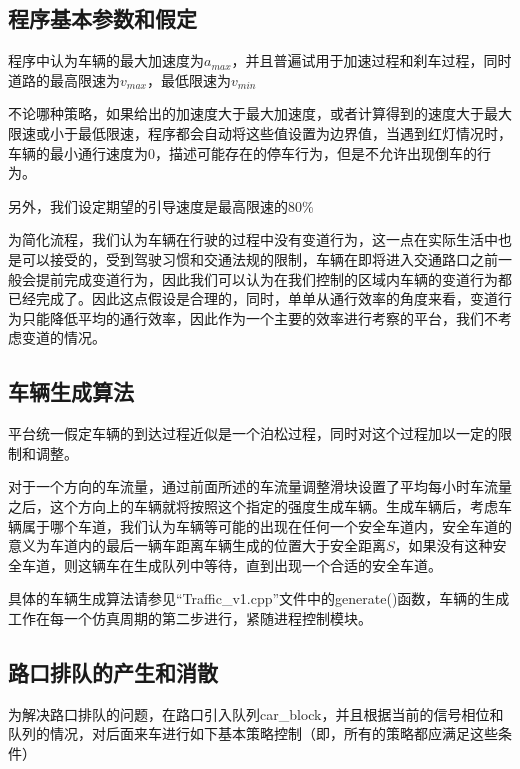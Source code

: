 \documentclass[UTF8,a4paper]{ctexart}
\begin{document}
\subsection{程序基本参数和假定}
程序中认为车辆的最大加速度为$a_{max}$，并且普遍试用于加速过程和刹车过程，同时道路的最高限速为$v_{max}$，最低限速为$v_{min}$

不论哪种策略，如果给出的加速度大于最大加速度，或者计算得到的速度大于最大限速或小于最低限速，程序都会自动将这些值设置为边界值，当遇到红灯情况时，车辆的最小通行速度为0，描述可能存在的停车行为，但是不允许出现倒车的行为。

另外，我们设定期望的引导速度是最高限速的80\%

为简化流程，我们认为车辆在行驶的过程中没有变道行为，这一点在实际生活中也是可以接受的，受到驾驶习惯和交通法规的限制，车辆在即将进入交通路口之前一般会提前完成变道行为，因此我们可以认为在我们控制的区域内车辆的变道行为都已经完成了。因此这点假设是合理的，同时，单单从通行效率的角度来看，变道行为只能降低平均的通行效率，因此作为一个主要的效率进行考察的平台，我们不考虑变道的情况。
\subsection{车辆生成算法}
平台统一假定车辆的到达过程近似是一个泊松过程，同时对这个过程加以一定的限制和调整。

对于一个方向的车流量，通过前面所述的车流量调整滑块设置了平均每小时车流量之后，这个方向上的车辆就将按照这个指定的强度生成车辆。生成车辆后，考虑车辆属于哪个车道，我们认为车辆等可能的出现在任何一个安全车道内，安全车道的意义为车道内的最后一辆车距离车辆生成的位置大于安全距离$S$，如果没有这种安全车道，则这辆车在生成队列中等待，直到出现一个合适的安全车道。

具体的车辆生成算法请参见“Traffic\_v1.cpp”文件中的generate()函数，车辆的生成工作在每一个仿真周期的第二步进行，紧随进程控制模块。
\subsection{路口排队的产生和消散}
为解决路口排队的问题，在路口引入队列car\_block，并且根据当前的信号相位和队列的情况，对后面来车进行如下基本策略控制（即，所有的策略都应满足这些条件）
\end{document}
